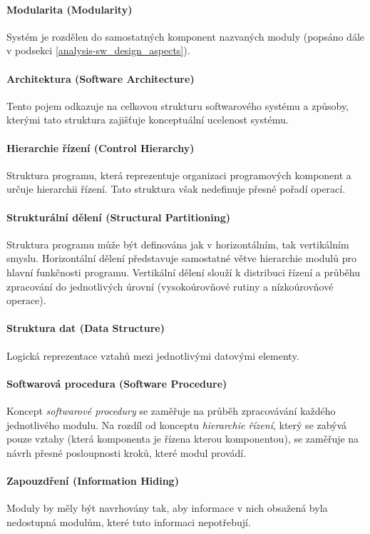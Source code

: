 \paragraph{Modularita (Modularity)} Systém je rozdělen do samostatných komponent nazvaných moduly (popsáno dále v podsekci \ref{analysis-sw_design_aspects}).

\paragraph{Architektura (Software Architecture)} Tento pojem odkazuje na celkovou strukturu softwarového systému a způsoby, kterými tato struktura zajišťuje konceptuální ucelenost systému.

\paragraph{Hierarchie řízení (Control Hierarchy)} Struktura programu, která reprezentuje organizaci programových komponent a určuje hierarchii řízení. Tato struktura však nedefinuje přesné pořadí operací.

\paragraph{Strukturální dělení (Structural Partitioning)} Struktura programu může být definována jak v horizontálním, tak vertikálním smyslu. Horizontální dělení představuje samostatné větve hierarchie modulů pro hlavní funkčnosti programu. Vertikální dělení slouží k distribuci řízení a průběhu zpracování do jednotlivých úrovní (vysokoúrovňové rutiny a nízkoúrovňové operace).

\paragraph{Struktura dat (Data Structure)} Logická reprezentace vztahů mezi jednotlivými datovými elementy.

\paragraph{Softwarová procedura (Software Procedure)} Koncept \emph{softwarové procedury} se zaměřuje na průběh zpracovávání každého jednotlivého modulu. Na rozdíl od konceptu \emph{hierarchie řízení}, který se zabývá pouze vztahy (která komponenta je řízena kterou komponentou), se zaměřuje na návrh přesné posloupnosti kroků, které modul provádí.

\paragraph{Zapouzdření (Information Hiding)} Moduly by měly být navrhovány tak, aby informace v nich obsažená byla nedostupná modulům, které tuto informaci nepotřebují.


